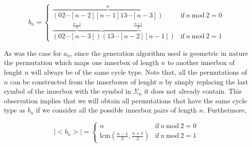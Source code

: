 \documentclass[a4paper,10pt]{article}
\begin{document}
\begin{equation}
b_n = \left\{
\begin{array}{ll}
\overbrace{(02\cdots[n-2][n-1]13\cdots[n-3])}^{n}&\textrm{if}~n~\textrm{mod}~2=0\\
\overbrace{(02\cdots[n-3])}^{\frac{n-1}{2}}\overbrace{(13\cdots[n-2][n-1])}^{\frac{n+1}{2}}&\textrm{if}~n~\textrm{mod}~2=1 
\end{array}
\right.
\end{equation}

As was the case for $a_n$, since the generation algorithm used is geometric in nature the permutation which maps one innerbox of length $n$ to another innerbox of lenght $n$ will always be of the same cycle type. Note that, all the  permutations of $n$ can be constructed from the innerboxes of lenght $n$ by simply replacing the last symbol of the innerbox with the symbol in $\Sigma_n$ it does not already contain. This observation implies that we will obtain all permutations that have the same cycle type as $b_n$ if we consider all the possible innerbox pairs of length $n$. Furthermore,

\begin{equation}
|\!\!<\!\!b_n\!\!>\!\!|= \left\{
\begin{array}{ll}
n &\textrm{if}~n~\textrm{mod}~2=0\\
\textrm{lcm}(\frac{n-1}{2},\frac{n+1}{2}) &\textrm{if}~n~\textrm{mod}~2=1 
\end{array}
\right.
\end{equation}


% 
 
\end{document}
